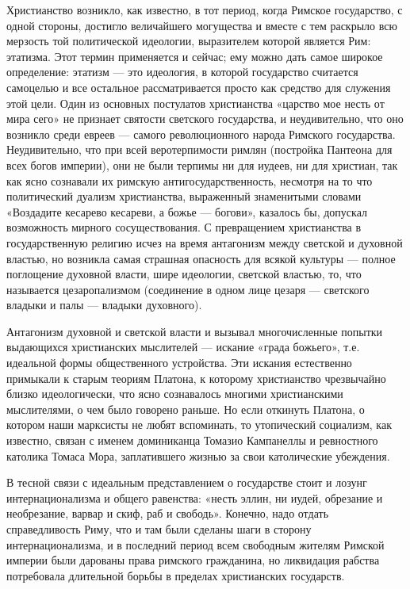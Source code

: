 Христианство возникло, как известно, в тот период, когда Римское
государство, с одной стороны, достигло величайшего могущества и вместе
с тем раскрыло всю мерзость той политической идеологии, выразителем
которой является Рим: этатизма. Этот термин применяется и сейчас; ему
можно дать самое широкое определение: этатизм --- это идеология, в
которой государство считается самоцелью и все остальное
рассматривается просто как средство для служения этой цели. Один из
основных постулатов христианства «царство мое несть от мира сего» не
признает святости светского государства, и неудивительно, что оно
возникло среди евреев --- самого революционного народа Римского
государства. Неудивительно, что при всей веротерпимости римлян
(постройка Пантеона для всех богов империи), они не были терпимы ни
для иудеев, ни для христиан, так как ясно сознавали их римскую
антигосударственность, несмотря на то что политический дуализм
христианства, выраженный знаменитыми словами «Воздадите кесарево
кесареви, а божье --- богови», казалось бы, допускал возможность
мирного сосуществования. С превращением христианства в государственную
религию исчез на время антагонизм между светской и духовной властью,
но возникла самая страшная опасность для всякой культуры --- полное
поглощение духовной власти, шире идеологии, светской властью, то, что
называется цезаропализмом (соединение в одном лице цезаря ---
светского владыки и палы --- владыки духовного).

Антагонизм духовной и светской власти и вызывал многочисленные попытки
выдающихся христианских мыслителей --- искание «града божьего», т.е.
идеальной формы общественного устройства. Эти искания естественно
примыкали к старым теориям Платона, к которому христианство
чрезвычайно близко идеологически, что ясно сознавалось многими
христианскими мыслителями, о чем было говорено раньше. Но если
откинуть Платона, о котором наши марксисты не любят вспоминать, то
утопический социализм, как известно, связан с именем доминиканца
Томазио Кампанеллы и ревностного католика Томаса Мора, заплатившего
жизнью за свои католические убеждения.

В тесной связи с идеальным представлением о государстве стоит и лозунг
интернационализма и общего равенства: «несть эллин, ни иудей,
обрезание и необрезание, варвар и скиф, раб и свободь». Конечно, надо
отдать справедливость Риму, что и там были сделаны шаги в сторону
интернационализма, и в последний период всем свободным жителям Римской
империи были дарованы права римского гражданина, но ликвидация рабства
потребовала длительной борьбы в пределах христианских государств.

